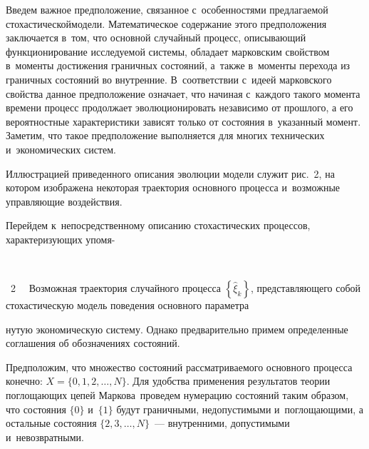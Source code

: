 \begin{multicols}{2}
Введем важное предположение, связанное с~осо\-бен\-но\-стя\-ми предлагаемой 
стохастической\linebreak модели. Математическое содержание этого предположения 
заключается в~том, что основной случайный процесс, описывающий 
функционирование исследуемой 
системы, обладает марковским свойством в~моменты достижения граничных состояний, 
а~также в~моменты перехода из граничных состояний во внутренние. 
В~соответствии с~идеей марковского свойства данное предположение означает, 
что начиная 
с~каждого такого момента времени процесс продолжает эволюционировать независимо от 
прошлого, а его вероятностные характеристики зависят только от состояния 
в~указанный момент. Заметим, что такое предположение выполняется для многих 
технических и~экономических систем.

Иллюстрацией приведенного описания эволюции модели служит рис.~2,
на котором изображена некоторая траектория основного процесса и~возможные
 управ\-ля\-ющие воздействия.
 
 Перейдем к~непосредственному описанию стохастических процессов, характеризующих 
упо\-мя-\linebreak\vspace*{-12pt}
 
 { \begin{center}  %
 \vspace*{18pt}
     \mbox{%
 \epsfxsize=77.802mm 
 }

\end{center}

\vspace*{-3pt}

\noindent
{{\figurename~2}\ \ \small{
Возможная траектория случайного процесса 
$\left\{ {\widehat{\xi}}_{k}\right\}$, представляющего собой 
стохастическую модель поведения основного параметра
}}}






\noindent
ну\-тую экономическую систему. Однако пред\-ва\-ри\-тель\-но примем определенные 
соглашения об обозначениях состояний.

Предположим, что множество состояний рассматриваемого основного процесса 
конечно:  $X=\lbrace0,1,2,\ldots ,N\rbrace $. Для удобства применения 
ре\-зуль\-татов теории поглощающих цепей Маркова~\cite{SN16}\linebreak проведем нумерацию 
состояний таким образом, что состояния $\{0\}$ и~$\{1\}$ будут граничными, 
недопустимыми и~поглощающими, а остальные состояния $\lbrace 2,3,\ldots 
,N\rbrace$~--- внутренними, допустимыми и~невозвратными.


\end{multicols}
